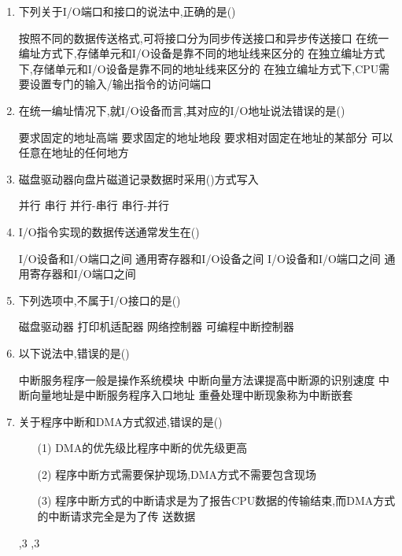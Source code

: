 \documentclass[12pt, a4paper, oneside, UTF8]{ctexbook}
\begin{document}
\begin{enumerate}
    \item 下列关于I/O端口和接口的说法中,正确的是() 
    \begin{choices}[1]
        \task 按照不同的数据传送格式,可将接口分为同步传送接口和异步传送接口
        \task 在统一编址方式下,存储单元和I/O设备是靠不同的地址线来区分的 
        \task 在独立编址方式下,存储单元和I/O设备是靠不同的地址线来区分的 
        \task 在独立编址方式下,CPU需要设置专门的输入/输出指令的访问端口 
    \end{choices}

    \item 在统一编址情况下,就I/O设备而言,其对应的I/O地址说法错误的是() 
    \begin{choices}[2] 
        \task 要求固定的地址高端
        \task 要求固定的地址地段
        \task 要求相对固定在地址的某部分
        \task 可以任意在地址的任何地方
    \end{choices}

    \item 磁盘驱动器向盘片磁道记录数据时采用()方式写入 
    \begin{choices}
        \task 并行 \task 串行 \task 并行-串行 \task 串行-并行 
    \end{choices}

    \item \bl I/O指令实现的数据传送通常发生在() 
    \begin{choices}[2]
        \task I/O设备和I/O端口之间 
        \task 通用寄存器和I/O设备之间 
        \task I/O设备和I/O端口之间 
        \task 通用寄存器和I/O端口之间 
    \end{choices}

    \item 下列选项中,不属于I/O接口的是() 
    \begin{choices}[2]
        \task 磁盘驱动器 \task 打印机适配器 \task 网络控制器 \task 可编程中断控制器 
    \end{choices}

    \item 以下说法中,错误的是() 
    \begin{choices}[1]
        \task 中断服务程序一般是操作系统模块 
        \task 中断向量方法课提高中断源的识别速度 
        \task 中断向量地址是中断服务程序入口地址 
        \task 重叠处理中断现象称为中断嵌套 
    \end{choices}

    \item  关于程序中断和DMA方式叙述,错误的是() 
    \begin{enumerate}
        \item [(1)] DMA的优先级比程序中断的优先级更高
        \item [(2)] 程序中断方式需要保护现场,DMA方式不需要包含现场
        \item [(3)] 程序中断方式的中断请求是为了报告CPU数据的传输结束,而DMA方式的中断请求完全是为了传
        送数据 
    \end{enumerate}
    \begin{choices}
         ,3  ,3
    \end{choices}


\end{enumerate}
\end{document}
